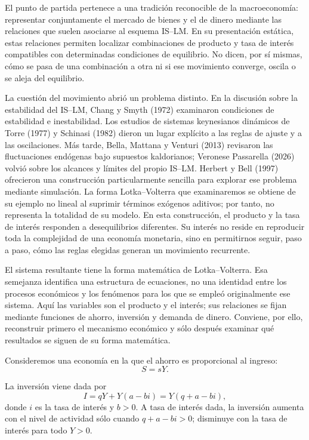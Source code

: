 \documentclass[10.5pt,twoside]{article}
\newcounter{rsec}
\newcommand{\rsection}{%
  \refstepcounter{rsec}%
  \par\vspace{1.35em}%
  \begin{center}\fontsize{14}{16}\selectfont\Roman{rsec}\end{center}%
  \vspace{0.35em}%
}
\begin{document}
\setcounter{page}{3}

\rsection
El punto de partida pertenece a una tradición reconocible de la macroeconomía: representar conjuntamente el mercado de bienes y el de dinero mediante las relaciones que suelen asociarse al esquema IS--LM. En su presentación estática, estas relaciones permiten localizar combinaciones de producto y tasa de interés compatibles con determinadas condiciones de equilibrio. No dicen, por sí mismas, cómo se pasa de una combinación a otra ni si ese movimiento converge, oscila o se aleja del equilibrio.

La cuestión del movimiento abrió un problema distinto. En la discusión sobre la estabilidad del IS--LM, Chang y Smyth (1972) examinaron condiciones de estabilidad e inestabilidad. Los estudios de sistemas keynesianos dinámicos de Torre (1977) y Schinasi (1982) dieron un lugar explícito a las reglas de ajuste y a las oscilaciones. Más tarde, Bella, Mattana y Venturi (2013) revisaron las fluctuaciones endógenas bajo supuestos kaldorianos; Veronese Passarella (2026) volvió sobre los alcances y límites del propio IS--LM. Herbert y Bell (1997) ofrecieron una construcción particularmente sencilla para explorar ese problema mediante simulación. La forma Lotka--Volterra que examinaremos se obtiene de su ejemplo no lineal al suprimir términos exógenos aditivos; por tanto, no representa la totalidad de su modelo. En esta construcción, el producto y la tasa de interés responden a desequilibrios diferentes. Su interés no reside en reproducir toda la complejidad de una economía monetaria, sino en permitirnos seguir, paso a paso, cómo las reglas elegidas generan un movimiento recurrente.

El sistema resultante tiene la forma matemática de Lotka--Volterra. Esa semejanza identifica una estructura de ecuaciones, no una identidad entre los procesos económicos y los fenómenos para los que se empleó originalmente ese sistema. Aquí las variables son el producto y el interés; sus relaciones se fijan mediante funciones de ahorro, inversión y demanda de dinero. Conviene, por ello, reconstruir primero el mecanismo económico y sólo después examinar qué resultados se siguen de su forma matemática.

Consideremos una economía en la que el ahorro es proporcional al ingreso:
\[
S=sY.
\]

La inversión viene dada por
\[
I=qY+Y(a-bi)=Y(q+a-bi),
\]
donde \(i\) es la tasa de interés y \(b>0\). A tasa de interés dada, la inversión aumenta con el nivel de actividad sólo cuando \(q+a-bi>0\); disminuye con la tasa de interés para todo \(Y>0\).
\end{document}
